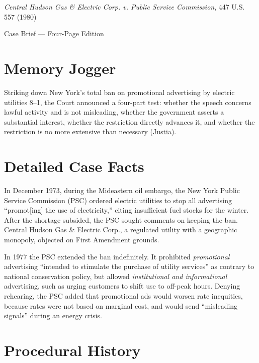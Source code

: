 \documentclass[12pt]{article}
\begin{document}
\begin{center}
{\LARGE \textit{Central Hudson Gas \& Electric Corp. v. Public Service Commission}, 447 U.S. 557 (1980)\par}
\vspace{0.8em}
{\large Case Brief --- Four-Page Edition\par}
\end{center}
\vspace{1em}

\section{Memory Jogger}

Striking down New York's total ban on promotional advertising by electric utilities 8--1, the Court announced a four-part test: whether the speech concerns lawful activity and is not misleading, whether the government asserts a substantial interest, whether the restriction directly advances it, and whether the restriction is no more extensive than necessary (\href{https://supreme.justia.com/cases/federal/us/447/557/}{Justia}).

\section{Detailed Case Facts}

In December 1973, during the Mideastern oil embargo, the New York Public Service Commission (PSC) ordered electric utilities to stop all advertising ``promot[ing] the use of electricity,'' citing insufficient fuel stocks for the winter. After the shortage subsided, the PSC sought comments on keeping the ban. Central Hudson Gas \& Electric Corp., a regulated utility with a geographic monopoly, objected on First Amendment grounds.

In 1977 the PSC extended the ban indefinitely. It prohibited \emph{promotional} advertising ``intended to stimulate the purchase of utility services'' as contrary to national conservation policy, but allowed \emph{institutional and informational} advertising, such as urging customers to shift use to off-peak hours. Denying rehearing, the PSC added that promotional ads would worsen rate inequities, because rates were not based on marginal cost, and would send ``misleading signals'' during an energy crisis.

\section{Procedural History}
\end{document}
